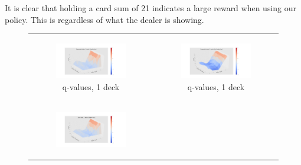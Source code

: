 It is clear that holding a card sum of 21 indicates a large reward when using our policy. 
This is regardless of what the dealer is showing.
\begin{figure}[htp]
\begin{tabular}{cc}
\centering
\begin{subfigure}[b]{0.48\textwidth}
  	 \includegraphics[width=\textwidth]{./figures/ace_3D_exp_1_decks.png}
   \caption{q-values, 1 deck\label{sfig:3Dnd1}}
\end{subfigure}
&
\begin{subfigure}[b]{0.48\textwidth}
  	 \includegraphics[width=\textwidth]{./figures/noace_3D_exp_1_decks.png}
   \caption{q-values, 1 deck\label{sfig:3Dnd2}}
\end{subfigure} \\
\begin{subfigure}[b]{0.48\textwidth}
  	 \includegraphics[width=\textwidth]{./figures/ace_3D_sum_1_decks.png}

\end{subfigure}
\end{tabular}
\end{figure}
